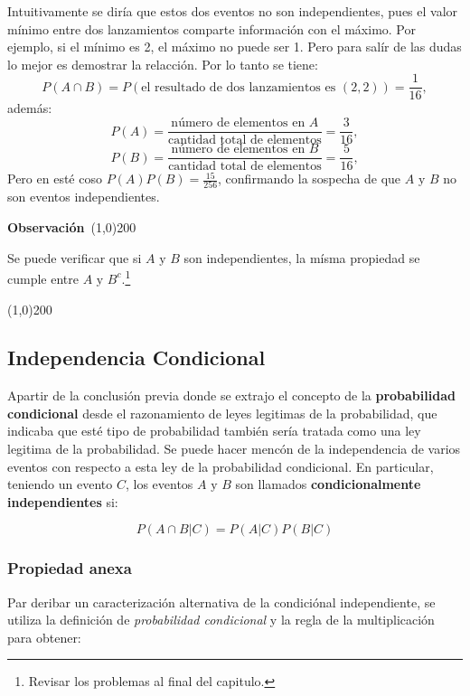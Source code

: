 \documentclass[a4paper,dvipsnames]{book}
\newenvironment{obs}
    {
        \begin{flushleft}
       \textbf{Observación}\
        \line(1,0){200} \
        \end{flushleft}
    }
    {
        \begin{flushright}
        \line(1,0){200}
        \end{flushright}
    }
\begin{document}
\begin{enumerate}[{(a) }]
    Intuitivamente se diría que estos dos eventos no son independientes, pues
    el valor mínimo entre dos lanzamientos comparte información con el máximo.
    Por ejemplo, si el {\color{Plum} mínimo es 2}, {\color{BlueViolet} el
    máximo no puede ser 1}. Pero para salír de las dudas lo mejor es demostrar
    la relacción. Por lo tanto se tiene:
    \[ P\left(A\cap B\right)=P\left(\text{el resultado de dos lanzamientos es
    }\left(2,2\right)\right)=\frac{1}{16} ,\]
    además:
    \[ P\left(A\right)=\frac{\text{número de elementos en }A}{\text{cantidad
    total de elementos}}=\frac{3}{16},\]
    \[ P\left(B\right)=\frac{\text{número de elementos en }B}{\text{cantidad
    total de elementos}}=\frac{5}{16} ,\]
    Pero en esté coso  \(P\left(A\right)P\left(B\right)=\frac{15}{256}\),
    confirmando la sospecha de que \(A \text{ y }B\) no son eventos
    independientes.
\end{enumerate}
\begin{obs}
    Se puede verificar que si \(A \text{ y }B\) son independientes, la mísma
    propiedad se cumple entre \(A \text{ y }B^{c}\).\footnote{Revisar los
    problemas al final del capitulo.}
\end{obs}

\subsection{Independencia Condicional}
\label{ssec:independencia_condicional}

Apartir de la conclusión previa donde se extrajo el concepto de la
\textbf{probabilidad condicional}  desde el razonamiento de leyes legitimas de
la probabilidad, que indicaba que esté tipo de probabilidad también sería
tratada como una ley legitima de la probabilidad. {\color{SeaGreen} Se puede
hacer mencón de la independencia de varios eventos con respecto a esta ley de
la probabilidad condicional}. En particular, teniendo un evento \(C\), los
eventos \(A \text{ y }B\) son llamados {\color{teal} \textbf{condicionalmente
independientes}} si:

\[ P\left(A\cap B|C\right)=P\left(A|C\right)P\left(B|C\right) \]

\subsubsection{Propiedad anexa}
Par deribar un caracterización alternativa de la condiciónal independiente, se utiliza la definición de \textit{probabilidad condicional} y la regla de la multiplicación para obtener:
\end{document}
